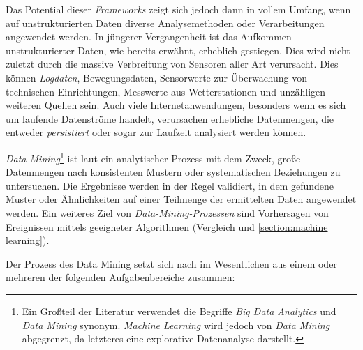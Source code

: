 Das Potential dieser \textit{Frameworks} zeigt sich jedoch dann in vollem Umfang, wenn auf unstrukturierten Daten diverse Analysemethoden oder Verarbeitungen angewendet werden. In jüngerer Vergangenheit ist das Aufkommen unstrukturierter Daten, wie bereits erwähnt, erheblich gestiegen. Dies wird nicht zuletzt durch die massive Verbreitung von Sensoren aller Art verursacht. Dies können \textit{Logdaten}, Bewegungsdaten, Sensorwerte zur Überwachung von technischen Einrichtungen, Messwerte aus Wetterstationen und unzähligen weiteren Quellen sein. Auch viele Internetanwendungen, besonders wenn es sich um laufende Datenströme handelt, verursachen erhebliche Datenmengen, die entweder \textit{persistiert} oder sogar zur Laufzeit analysiert werden können.  

\textit{Data Mining}\footnote{Ein Großteil der Literatur verwendet die Begriffe \textit{Big Data Analytics }und \textit{Data Mining} synonym. \textit{Machine Learning} wird jedoch von \textit{Data Mining} abgegrenzt, da letzteres eine explorative Datenanalyse darstellt.} ist laut  ein analytischer Prozess mit dem Zweck, große Datenmengen nach konsistenten Mustern oder systematischen Beziehungen zu untersuchen. Die Ergebnisse werden in der Regel validiert, in dem gefundene Muster oder Ähnlichkeiten auf einer Teilmenge der ermittelten Daten angewendet werden. Ein weiteres Ziel von \textit{Data-Mining-Prozessen} sind Vorhersagen von Ereignissen mittels geeigneter Algorithmen (Vergleich  und \ref{section:machine learning}). 

Der Prozess des Data Mining setzt sich nach  im Wesentlichen aus einem oder mehreren der folgenden Aufgabenbereiche zusammen:

